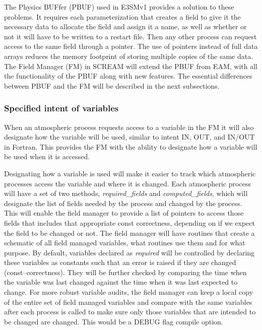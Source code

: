 The Physics BUFfer (PBUF) used in E3SMv1 provides a solution to these problems. It requires each parameterization that creates a field to give it the necessary data to allocate the field and assign it a name, as well as whether or not it will have to be written to a restart file.  Then any other process can request access to the same field through a pointer.  The use of pointers instead of full data arrays reduces the memory footprint of storing multiple copies of the same data.  The Field Manager (FM) in SCREAM will extend the PBUF from EAM, with all the functionality of the PBUF along with new features.  The essential differences between PBUF and the FM will be described in the next subsections.

\subsubsection{Specified intent of variables}
When an atmospheric process requests access to a variable in the FM it will also designate how the variable will be used, similar to intent IN, OUT, and IN/OUT in Fortran. This provides the FM with the ability to designate how a variable will be used when it is accessed.  

Designating how a variable is used will make it easier to track which atmospheric processes access the variable and where it is changed.  Each atmospheric process will have a set of two methods, \emph{required\_fields} and \emph{computed\_fields}, which will designate the list of fields needed by the process and changed by the process.  This will enable the field manager to provide a list of pointers to access those fields that includes that appropriate const correctness, depending on if we expect the field to be changed or not.  The field manager will have routines that create a schematic of all field managed variables, what routines use them and for what purpose.    By default, variables declared as \emph{required} will be controlled by declaring these variables as constants such that an error is raised if they are changed (const--correctness).  They will be further checked by comparing the time when the variable was last changed against the time when it was last expected to change.  For more robust variable audits, the field manager can keep a local copy of the entire set of field managed variables and compare with the same variables after each process is called to make sure only those variables that are intended to be changed are changed.  This would be a DEBUG flag compile option.


